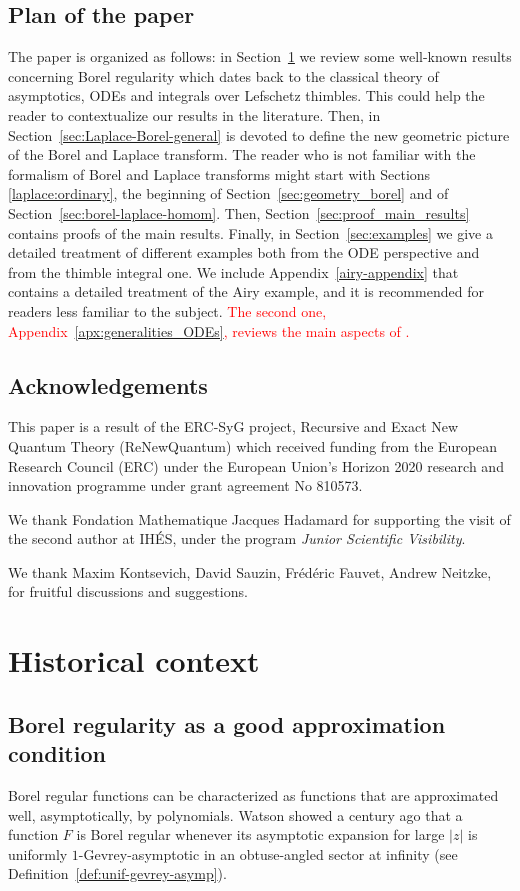 \documentclass{article}
\theoremstyle{definition}
\theoremstyle{plain}
\begin{document}
\subsection{Plan of the paper}
The paper is organized as follows: in Section~\ref{sec:historical-context} we review some well-known results concerning Borel regularity which dates back to the classical theory of asymptotics, ODEs and integrals over Lefschetz thimbles. This could help the reader to contextualize our results in the literature. Then, in Section~\ref{sec:Laplace-Borel-general} is devoted to define the new geometric picture of the Borel and Laplace transform. The reader who is not familiar with the formalism of Borel and Laplace transforms might start with Sections \ref{laplace:ordinary}, the beginning of Section~\ref{sec:geometry_borel} and of Section~\ref{sec:borel-laplace-homom}. Then, Section~\ref{sec:proof_main_results} contains proofs of the main results. Finally, in Section~\ref{sec:examples} we give a detailed treatment of different examples both from the ODE perspective and from the thimble integral one. 
We include Appendix~\ref{airy-appendix} that contains a detailed treatment of the Airy example, and it is recommended for readers less familiar to the subject. \textcolor{red}{The second one, Appendix~\ref{apx:generalities_ODEs}, reviews the main aspects of \cite{reg-sing-volterra}.}  
%
\subsection{Acknowledgements}
This paper is a result of the ERC-SyG project, Recursive and Exact New Quantum Theory (ReNewQuantum) which received funding from the European Research Council (ERC) under the European Union's Horizon 2020 research and innovation programme under grant agreement No 810573. 

We thank Fondation Mathematique Jacques Hadamard for supporting the visit of the second author at IH\'ES, under the program \textit{Junior Scientific Visibility}. 

We thank Maxim Kontsevich, David Sauzin, Fr\'ed\'eric Fauvet, Andrew Neitzke, for fruitful discussions and suggestions. 
%
\section{Historical context}\label{sec:historical-context}
%
\subsection{Borel regularity as a good approximation condition}
Borel regular functions can be characterized as functions that are approximated well, asymptotically, by polynomials. Watson showed a century ago \cite[Part II, Section 9]{watson2} that a function $F$ is Borel regular whenever its asymptotic expansion for large $|z|$ is uniformly $1$-Gevrey-asymptotic in an obtuse-angled sector at infinity (see Definition~\ref{def:unif-gevrey-asymp}).
\end{document}

